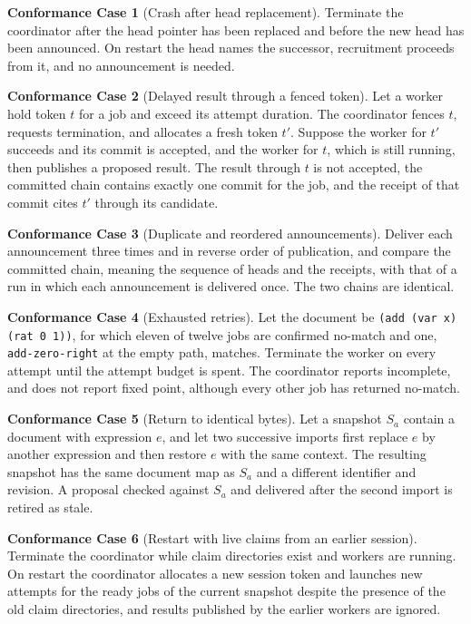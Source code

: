 \documentclass[11pt,a4paper]{article}
\theoremstyle{plain}
\theoremstyle{definition}
\theoremstyle{remark}
\theoremstyle{definition}
\newtheorem{case}{Conformance Case}
\newcommand{\code}[1]{\texttt{#1}}
\begin{document}
\begin{case}[Crash after head replacement]
Terminate the coordinator after the head pointer has been replaced and before the new head has been announced. On restart the head names the successor, recruitment proceeds from it, and no announcement is needed.
\end{case}

\begin{case}[Delayed result through a fenced token]
Let a worker hold token $t$ for a job and exceed its attempt duration. The coordinator fences $t$, requests termination, and allocates a fresh token $t'$. Suppose the worker for $t'$ succeeds and its commit is accepted, and the worker for $t$, which is still running, then publishes a proposed result. The result through $t$ is not accepted, the committed chain contains exactly one commit for the job, and the receipt of that commit cites $t'$ through its candidate.
\end{case}

\begin{case}[Duplicate and reordered announcements]
Deliver each announcement three times and in reverse order of publication, and compare the committed chain, meaning the sequence of heads and the receipts, with that of a run in which each announcement is delivered once. The two chains are identical.
\end{case}

\begin{case}[Exhausted retries]
Let the document be \code{(add (var x) (rat 0 1))}, for which eleven of twelve jobs are confirmed no-match and one, \code{add-zero-right} at the empty path, matches. Terminate the worker on every attempt until the attempt budget is spent. The coordinator reports incomplete, and does not report fixed point, although every other job has returned no-match.
\end{case}

\begin{case}[Return to identical bytes]
Let a snapshot $S_a$ contain a document with expression $e$, and let two successive imports first replace $e$ by another expression and then restore $e$ with the same context. The resulting snapshot has the same document map as $S_a$ and a different identifier and revision. A proposal checked against $S_a$ and delivered after the second import is retired as stale.
\end{case}

\begin{case}[Restart with live claims from an earlier session]
Terminate the coordinator while claim directories exist and workers are running. On restart the coordinator allocates a new session token and launches new attempts for the ready jobs of the current snapshot despite the presence of the old claim directories, and results published by the earlier workers are ignored.
\end{case}
\end{document}
